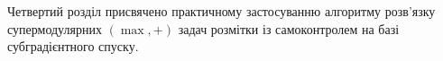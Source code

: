 Четвертий розділ присвячено практичному застосуванню алгоритму розв’язку 
супермодулярних $(\max,+)$ задач розмітки із самоконтролем на базі 
субградієнтного спуску. 